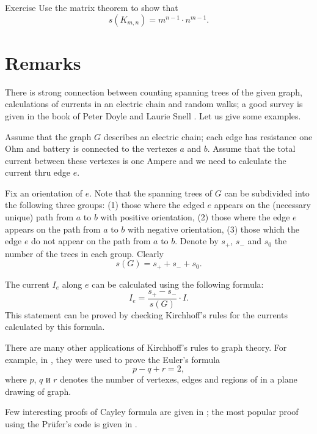 \begin{thm}{Exercise}
Use the matrix theorem to show that 
\[s(K_{m,n})=m^{n-1}\cdot n^{m-1}.\]
\end{thm}



\section*{Remarks}

There is strong connection between counting spanning trees of the given graph,
calculations of currents in an electric chain 
and random walks; a good survey is given in the book of Peter Doyle and Laurie Snell \cite{doyle-snell}. Let us give some examples.

Assume that the graph $G$ describes an electric chain;
each edge has resistance one Ohm and battery is connected to the vertexes $a$ and $b$.
Assume that the total current between these vertexes is one Ampere and we need to calculate the current thru edge $e$.

Fix an orientation of $e$.
Note that the spanning trees of $G$ can be subdivided into the following three groups:
(1) those where the edged $e$ appears on the (necessary unique) path from $a$ to $b$ with positive orientation,
(2) those where the edge $e$ appears on the path from $a$ to $b$ with negative orientation,
(3) those which the edge $e$ do not appear on the path from $a$ to $b$.
Denote by $s_+$, $s_-$ and $s_0$ the number of the trees in each group.
Clearly 
\[s(G)=s_++s_-+s_0.\]

The current $I_e$ along $e$ can be calculated using the following formula:
\[I_e=\frac{s_+-s_-}{s(G)}\cdot I.\]
This statement can be proved by checking Kirchhoff's rules for the currents calculated by this formula.

There are many other applications of Kirchhoff's rules to graph theory.
For example, in \cite{levi}, they were used to prove the Euler's formula
\[p-q+r=2,\]
where $p$, $q$ и $r$ denotes the number of vertexes, edges and regions of in a plane drawing of graph.

Few interesting proofs of Cayley formula are given in \cite[Chapter 30]{aigner-ziegler};
the most popular proof using the Pr\"ufer's code is given in \cite{pearls}.



